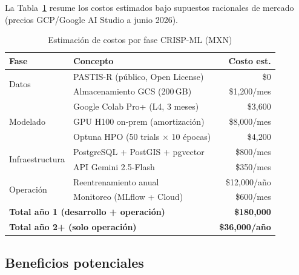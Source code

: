\documentclass{article}
\begin{document}
La Tabla~\ref{tab:costs} resume los costos estimados bajo supuestos
racionales de mercado (precios GCP/Google AI Studio a junio 2026).

\begin{table}[htbp]
\caption{Estimación de costos por fase CRISP-ML (MXN)}
\label{tab:costs}
\centering
\begin{tabularx}{\columnwidth}{lXr}
\toprule
\textbf{Fase} & \textbf{Concepto} & \textbf{Costo est.} \\
\midrule
\multirow{2}{*}{Datos}
  & PASTIS-R (público, Open License) & \$0 \\
  & Almacenamiento GCS (200\,GB) & \$1,200/mes \\
\midrule
\multirow{3}{*}{Modelado}
  & Google Colab Pro+ (L4, 3 meses) & \$3,600 \\
  & GPU H100 on-prem (amortización) & \$8,000/mes \\
  & Optuna HPO (50 trials × 10 épocas) & \$4,200 \\
\midrule
\multirow{2}{*}{Infraestructura}
  & PostgreSQL + PostGIS + pgvector & \$800/mes \\
  & API Gemini 2.5-Flash & \$350/mes \\
\midrule
\multirow{2}{*}{Operación}
  & Reentrenamiento anual & \$12,000/año \\
  & Monitoreo (MLflow + Cloud) & \$600/mes \\
\midrule
\multicolumn{2}{l}{\textbf{Total año 1 (desarrollo + operación)}}
  & \textbf{\$180,000} \\
\multicolumn{2}{l}{\textbf{Total año 2+ (solo operación)}}
  & \textbf{\$36,000/año} \\
\bottomrule
\end{tabularx}
\end{table}

\subsection{Beneficios potenciales}
\end{document}
